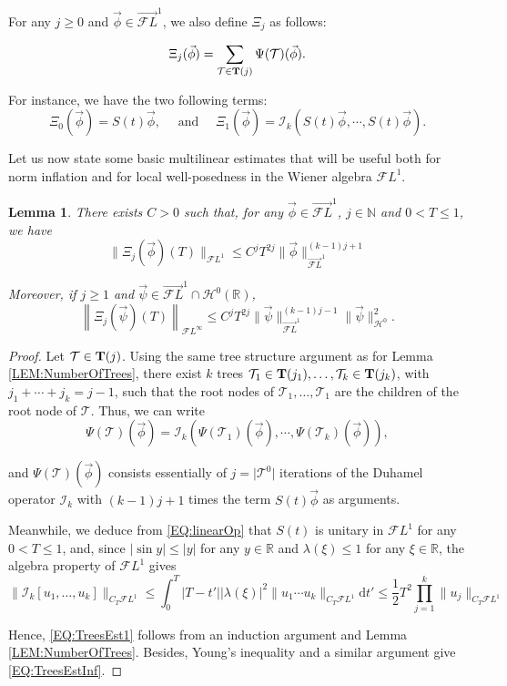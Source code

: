 \documentclass[letterpaper, 11pt,  reqno]{amsart}
\newtheorem{lemma}[theorem]{Lemma}
\newcommand{\1}{\hspace{0.5mm}\text{I}\hspace{0.5mm}}
\newcommand{\I}{\mathcal{I}}
\newcommand{\noi}{\noindent}
\newcommand{\R}{\mathbb{R}}
\newcommand{\TT}{\mathcal{T}}
\newcommand{\BT}{{\bf T}}%
\newcommand{\NB}{\mathbb{N}}
\newcommand{\FL}{\mathcal{F}L} %
\newcommand{\FLv}{\overrightarrow{\mathcal{F}L}}
\renewcommand{\H}{\mathcal{H}}
\newcommand{\ld}{\lambda}
\numberwithin{equation}{section}
\numberwithin{theorem}{section}
\newcommand{\abs}[1]{\lvert#1\rvert}
\begin{document}
\noi For any $j \geq 0$ and $\vec{\phi} \in \FLv^1$, we also define $\Xi_j$ as follows: 

\begin{equation}
\label{DEF:Xi_j}
\Xi_j (\vec{\phi}) = \sum_{\TT \in \BT (j)} \Psi(\TT)( \vec{\phi} ).
\end{equation}

\noi For instance, we have the two following terms:
$$
 \Xi_0 (\vec{\phi}) = S(t) \vec{\phi}, \quad \text{ and } \quad  \Xi_1 (\vec{\phi}) = \I_k ( S(t) \vec{\phi}, \cdots,  S(t) \vec{\phi}).
$$

\noi Let us now state some basic multilinear estimates that will be useful both for norm inflation and for local well-posedness in the Wiener algebra $\FL^1$.

\begin{lemma}
\label{LEM:TreesEstFL}
There exists $C > 0$ such that, for any $\vec{\phi} \in \FLv^1$, $j \in \NB$ and $0 < T \leq 1$, we have
\begin{equation}
\label{EQ:TreesEst1}
\big\| \Xi_j (\vec{\phi}) (T) \big\|_{\FL^1} \leq C^j T^{2j} \| \vec{\phi} \|^{(k-1)j+1}_{\FLv^1}
\end{equation}

\noi Moreover, if $j \geq 1$ and $\vec{\psi} \in \FLv^1 \cap \H^0 \left(\R\right)$,
\begin{equation}
\label{EQ:TreesEstInf}
\left\| \Xi_j (\vec{\psi} ) (T) \right\|_{\FL^\infty} \leq C^j T^{2j} \| \vec{\psi} \|^{(k-1)j-1}_{\FLv^1} \| \vec{\psi} \|^{2}_{\H^0}. 
\end{equation}
\end{lemma}

\begin{proof}
Let $\TT \in \BT (j)$. Using the same tree structure argument as for Lemma \ref{LEM:NumberOfTrees}, there exist $k$ trees $\TT_1 \in \BT(j_1), \dots,  \TT_k \in\BT(j_k)$, with $j_1 + \cdots + j_k = j-1$, such that the root nodes of $\TT_1, \dots, \TT_1$ are the children of the root node of $\TT$. Thus, we can write
$$
\Psi(\TT) (\vec{\phi}) = \I_k (\Psi(\TT_1) (\vec{\phi}), \cdots , \Psi(\TT_k) (\vec{\phi}) ),
$$

\noi and $\Psi(\TT) (\vec{\phi})$ consists essentially of $j = \abs{\TT^0}$ iterations of the Duhamel operator $\I_k$ with $(k-1)j + 1$ times the term $S(t)\vec{\phi}$ as arguments. 

Meanwhile, we deduce from \eqref{EQ:linearOp} that $S(t)$ is unitary in $\FL^1$ for any $ 0 < T \leq 1$, and, since $\abs{\sin y} \leq \abs{y}$ for any $y \in \R$ and $\ld(\xi) \leq 1$ for any $\xi \in \R$, the algebra property of $\FL^1$ gives
\begin{equation}
\label{EQ:EstDuhamelOp}
\| \I_k [u_1, \dots, u_k] \|_{C_T \FL^1} \leq \int^T_0 \abs{T-t'} \abs{\ld(\xi)}^2 \| u_1 \cdots u_k \|_{C_T \FL^1} \mathrm{d}t' \leq \frac 12 T^2 \prod^k_{j=1}  \| u_j \|_{C_T \FL^1}
\end{equation}

\noi Hence, \eqref{EQ:TreesEst1} follows from an induction argument and Lemma \ref{LEM:NumberOfTrees}. Besides, Young's inequality and a similar argument give \eqref{EQ:TreesEstInf}.


\end{proof}
\end{document}
